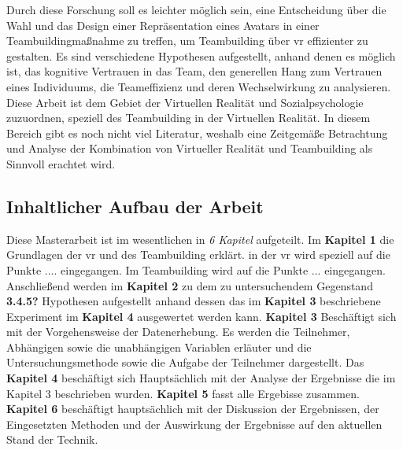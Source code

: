 \documentclass[a4paper,11pt]{article}%
\renewcommand{\\}{\vspace*{0.5\baselineskip} \newline}
\begin{document}
	Durch diese Forschung soll es leichter möglich sein, eine Entscheidung über die Wahl und das Design einer Repräsentation eines Avatars in einer Teambuildingmaßnahme zu treffen, um Teambuilding über \ac{vr} effizienter zu gestalten.\\
	Es sind verschiedene Hypothesen aufgestellt, anhand denen es möglich ist, das kognitive Vertrauen in das Team, den generellen Hang zum Vertrauen eines Individuums, die Teameffizienz und deren Wechselwirkung zu analysieren.
	Diese Arbeit ist dem Gebiet der Virtuellen Realität und Sozialpsychologie zuzuordnen, speziell des Teambuilding in der Virtuellen Realität.
	In diesem Bereich gibt es noch nicht viel Literatur, weshalb eine Zeitgemäße Betrachtung und Analyse der Kombination von Virtueller Realität und Teambuilding als Sinnvoll erachtet wird.\\



	\subsection{Inhaltlicher Aufbau der Arbeit}
	Diese Masterarbeit ist im wesentlichen in \textit{6 Kapitel} aufgeteilt.
	Im \textbf{Kapitel 1} die Grundlagen der \ac{vr} und des Teambuilding erklärt. in der \ac{vr} wird speziell auf die Punkte .... eingegangen.\\
	Im Teambuilding wird auf die Punkte ... eingegangen.\\
	Anschließend werden im \textbf{Kapitel 2} zu dem zu untersuchendem Gegenstand \textbf{3.4.5?} Hypothesen aufgestellt anhand dessen das im \textbf{Kapitel 3} beschriebene Experiment im \textbf{Kapitel 4} ausgewertet werden kann.\\
	\textbf{Kapitel 3} Beschäftigt sich mit der Vorgehensweise der Datenerhebung.
	Es werden die Teilnehmer, Abhängigen sowie die unabhängigen Variablen erläuter und die Untersuchungsmethode sowie die Aufgabe der Teilnehmer dargestellt.\\
	Das \textbf{Kapitel 4} beschäftigt sich Hauptsächlich mit der Analyse der Ergebnisse die im Kapitel 3 beschrieben wurden.\\
	\textbf{Kapitel 5} fasst alle Ergebisse zusammen.\\
	\textbf{Kapitel 6} beschäftigt hauptsächlich mit der Diskussion der Ergebnissen, der Eingesetzten Methoden und der Auswirkung der Ergebnisse auf den aktuellen Stand der Technik.\\
	
\end{document}
